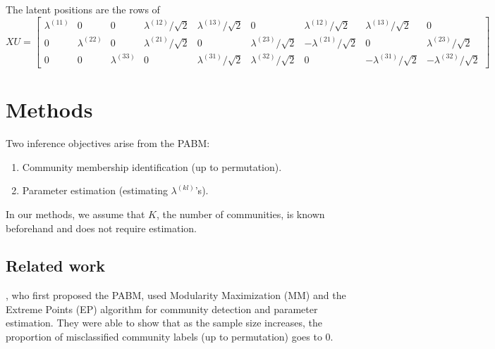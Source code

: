 \documentclass[
  12pt,
]{article}
\providecommand{\tightlist}{%
  \setlength{\itemsep}{0pt}\setlength{\parskip}{0pt}}
\begin{document}
\begin{example}[$K = 3$]
The latent positions are the rows of  
$$XU = \begin{bmatrix}
  \lambda^{(11)} & 0 & 0 & 
  \lambda^{(12)} / \sqrt{2} & \lambda^{(13)} / \sqrt{2} & 0 & 
  \lambda^{(12)} / \sqrt{2} & \lambda^{(13)} / \sqrt{2} & 0 \\
  0 & \lambda^{(22)} & 0 & 
  \lambda^{(21)} / \sqrt{2} & 0 & \lambda^{(23)} / \sqrt{2} & 
  -\lambda^{(21)} / \sqrt{2} & 0 & \lambda^{(23)} / \sqrt{2} \\
  0 & 0 & \lambda^{(33)} & 
  0 & \lambda^{(31)} / \sqrt{2} & \lambda^{(32)} / \sqrt{2} & 
  0 & -\lambda^{(31)} / \sqrt{2} & -\lambda^{(32)} / \sqrt{2}
\end{bmatrix}$$
\end{example}

\hypertarget{methods}{%
\section{Methods}\label{methods}}

Two inference objectives arise from the PABM:

\begin{enumerate}
\def\labelenumi{\arabic{enumi}.}
\tightlist
\item
  Community membership identification (up to permutation).
\item
  Parameter estimation (estimating \(\lambda^{(kl)}\)'s).
\end{enumerate}

In our methods, we assume that \(K\), the number of communities, is
known beforehand and does not require estimation.

\hypertarget{related-work}{%
\subsection{Related work}\label{related-work}}

\citeauthor{307cbeb9b1be48299388437423d94bf1}, who first proposed the
PABM, used Modularity Maximization (MM) and the Extreme Points (EP)
algorithm \cite{le2016} for community detection and parameter
estimation. They were able to show that as the sample size increases,
the proportion of misclassified community labels (up to permutation)
goes to 0.
\end{document}
